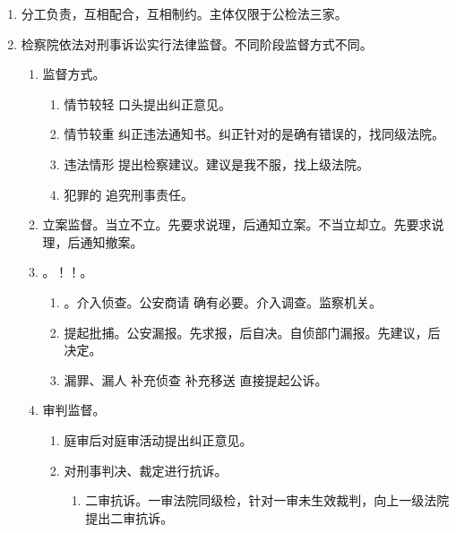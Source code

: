 \begin{enumerate}
\begin{enumerate}
          \item 法院和检察院门当户对。。
        \end{enumerate}
  \item 分工负责，互相配合，互相制约。主体仅限于公检法三家。
  \item \san 检察院依法对刑事诉讼实行法律监督。不同阶段监督方式不同。
        \begin{enumerate}
          \item 监督方式。
                \begin{enumerate}
                  \item 情节较轻 \yjt 口头提出纠正意见。
                  \item 情节较重 \yjt 纠正违法通知书。纠正针对的是确有错误的，找同级法院。
                  \item 违法情形 \yjt 提出检察建议。建议是我不服，找上级法院。
                  \item 犯罪的 \yjt 追究刑事责任。
                \end{enumerate}
          \item 立案监督。\yi 当立不立。先要求说理，后通知立案。\er 不当立却立。先要求说理，后通知撤案。
          \item {}。！！。
                \begin{enumerate}
                  \item {}。\yi 介入侦查。公安商请 \hz 确有必要。\er 介入调查。监察机关。
                  \item 提起批捕。\yi 公安漏报。先求报，后自决。\er 自侦部门漏报。先建议，后决定。
                  \item 漏罪、漏人 \yjt 补充侦查 \hz 补充移送 \hz 直接提起公诉。
                \end{enumerate}
          \item 审判监督。
                \begin{enumerate}
                  \item 庭审后对庭审活动提出纠正意见。
                  \item 对刑事判决、裁定进行抗诉。
                        \begin{enumerate}
                          \item 二审抗诉。一审法院同级检，针对一审未生效裁判，向上一级法院提出二审抗诉。

\end{enumerate}
\end{enumerate}
\end{enumerate}
\end{enumerate}
